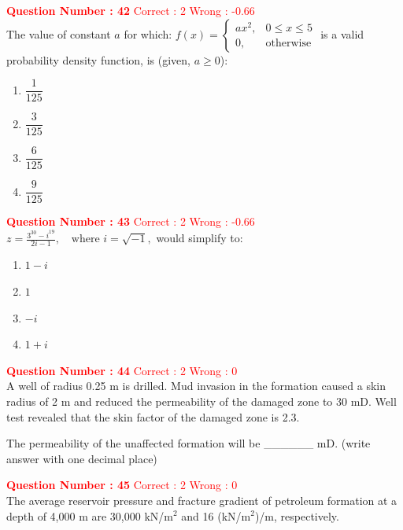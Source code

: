 \documentclass[12pt]{article}
\begin{document}
{\vspace{2ex}

\textbf{\textcolor{red}{Question Number : 42}} \hfill \textcolor{red}{Correct : 2  Wrong : -0.66} \\[1ex]
The value of constant $a$ for which:
{\LARGE$ 
f(x) = \begin{cases}
ax^2, & 0 \leq x \leq 5 \\
0, & \text{otherwise}
\end{cases}
$}
is a valid probability density function, is (given, $a \geq 0$):

\begin{enumerate}[label=(\Alph*)]
    \item $\dfrac{1}{125}$
    \item $\dfrac{3}{125}$
    \item $\dfrac{6}{125}$
    \item $\dfrac{9}{125}$
\end{enumerate}

\vspace{2ex}

\textbf{\textcolor{red}{Question Number : 43}} \hfill \textcolor{red}{Correct : 2  Wrong : -0.66} \\[1ex]
{\LARGE$
z = \frac{3^{30} - i^{19}}{2i - 1}, \quad \text{where } i = \sqrt{-1},
$ }
would simplify to:

\begin{enumerate}[label=(\Alph*)]
    \item $1 - i$
    \item $1$
    \item $-i$
    \item $1 + i$
\end{enumerate}

\textbf{\textcolor{red}{Question Number : 44}} \hfill \textcolor{red}{Correct : 2  Wrong : 0} \\[1ex]
A well of radius 0.25 m is drilled. Mud invasion in the formation caused a skin radius of 2 m and reduced the permeability of the damaged zone to 30 mD. Well test revealed that the skin factor of the damaged zone is 2.3.

The permeability of the unaffected formation will be \_\_\_\_\_\_ mD. (write answer with one decimal place)

\newpage

\vspace{2ex}


\textbf{\textcolor{red}{Question Number : 45}} \hfill \textcolor{red}{Correct : 2  Wrong : 0} \\[1ex]
The average reservoir pressure and fracture gradient of petroleum formation at a depth of 4,000 m are 30,000 kN/m$^2$ and 16 (kN/m$^2$)/m, respectively.

}
\end{document}
